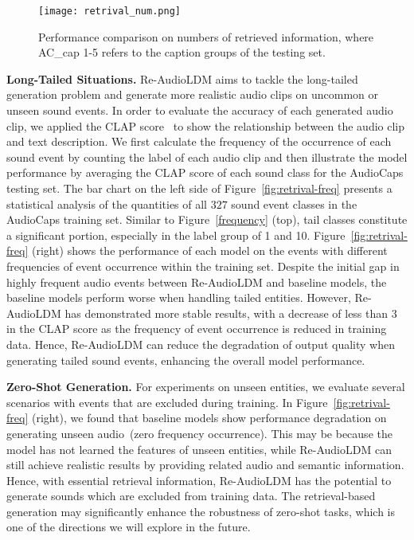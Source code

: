 \documentclass{article}
\begin{document}
\begin{figure}[htbp]
    \centering
    \texttt{[image: retrival\_num.png]}
    \caption{Performance comparison on numbers of retrieved information, where AC\_cap 1-5 refers to the caption groups of the testing set. }
    \label{fig:retriva-number}
\end{figure}

\noindent
\textbf{Long-Tailed Situations.}
Re-AudioLDM aims to tackle the long-tailed generation problem and generate more realistic audio clips on uncommon or unseen sound events. In order to evaluate the accuracy of each generated audio clip, we applied the CLAP score~\cite{clap} to show the relationship between the audio clip and text description. We first calculate the frequency of the occurrence of each sound event by counting the label of each audio clip and then illustrate the model performance by averaging the CLAP score of each sound class for the AudioCaps testing set. The bar chart on the left side of Figure~\ref{fig:retrival-freq} presents a statistical analysis of the quantities of all $327$ sound event classes in the AudioCaps training set. Similar to Figure~\ref{frequency} (top), tail classes constitute a significant portion, especially in the label group of 1 and 10. Figure~\ref{fig:retrival-freq} (right) shows the performance of each model on the events with different frequencies of event occurrence within the training set. Despite the initial gap in highly frequent audio events between Re-AudioLDM and baseline models, the baseline models perform worse when handling tailed entities. However, Re-AudioLDM has demonstrated more stable results, with a decrease of less than $3$ in the CLAP score as the frequency of event occurrence is reduced in training data. Hence, Re-AudioLDM can reduce the degradation of output quality when generating tailed sound events, enhancing the overall model performance. 

\noindent
\textbf{Zero-Shot Generation.}
For experiments on unseen entities, we evaluate several scenarios with events that are excluded during training. In Figure~\ref{fig:retrival-freq} (right), we found that baseline models show performance degradation on generating unseen audio~(zero frequency occurrence). This may be because the model has not learned the features of unseen entities, while Re-AudioLDM can still achieve realistic results by providing related audio and semantic information. Hence, with essential retrieval information, Re-AudioLDM has the potential to generate sounds which are excluded from training data. The retrieval-based generation may significantly enhance the robustness of zero-shot tasks, which is one of the directions we will explore in the future. 
\end{document}
